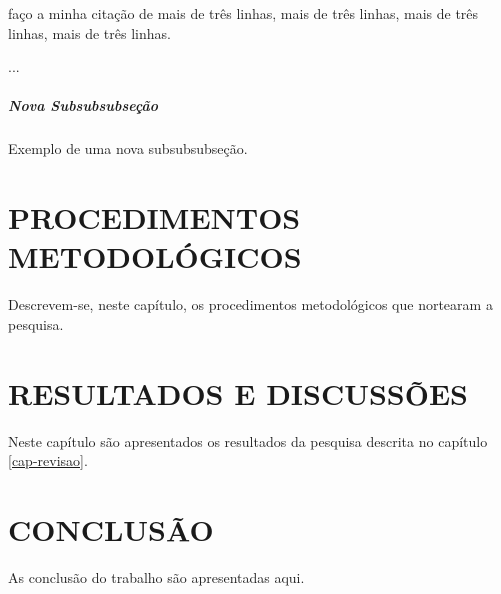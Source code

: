 \documentclass[
	12pt,				%
	openright,			%
	oneside,			%
	a4paper,			%
	chapter=TITLE,		%
	section=TITLE,		%
	english,			%
	french,				%
	spanish,			%
	brazil				%
	]{abntex2}
\begin{document}
\begin{citacao}
faço a minha citação de mais de três linhas, mais de três linhas, mais de três linhas, mais de três linhas.\cite{josuttis2007soa}
\end{citacao}

 ...




\paragraph{Nova Subsubsubseção}

Exemplo de uma nova subsubsubseção.

\chapter{PROCEDIMENTOS METODOLÓGICOS}

Descrevem-se, neste capítulo, os procedimentos metodológicos que nortearam a pesquisa.

\chapter{RESULTADOS E DISCUSSÕES}

Neste capítulo são apresentados os resultados da pesquisa descrita no capítulo \ref{cap-revisao}.

\chapter{CONCLUSÃO}

As conclusão do trabalho são apresentadas aqui.





%
%
\end{document}
